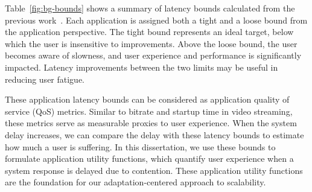 Table~\ref{fig:bg-bounds} shows a summary of latency bounds calculated from the
previous work~\cite{chen2017empirical}. Each application is assigned both a
tight and a loose bound from the application perspective. The tight bound
represents an ideal target, below which the user is insensitive to improvements.
Above the loose bound, the user becomes aware of slowness, and user experience
and performance is significantly impacted. Latency improvements between the two
limits may be useful in reducing user fatigue.

These application latency bounds can be considered as application quality of
service (QoS) metrics. Similar to bitrate and startup time in video streaming,
these metrics serve as measurable proxies to user experience. When the system
delay increases, we can compare the delay with these latency bounds to estimate
how much a user is suffering. In this dissertation, we use these bounds to
formulate application utility functions, which quantify user experience when a
system response is delayed due to contention. These application utility
functions are the foundation for our adaptation-centered approach to
scalability.